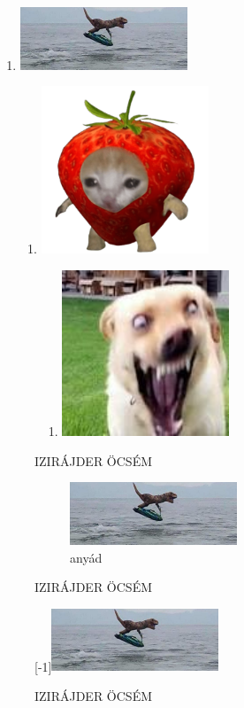 \documentclass{article}
\begin{document}
\begin{enumerate}
\item \includegraphics[width=5cm]{forras/image1}
\begin{enumerate}
\item \includegraphics[width=5cm]{forras/image2}
\begin{enumerate}
\item \includegraphics[width=5cm]{forras/image3}
\end{enumerate}
\end{enumerate}
\end{enumerate}
\begin{figure}[bt]
\centering
\caption{IZIRÁJDER ÖCSÉM}
\begin{subfigure}[c]{5cm}
\includegraphics[width=5cm]{forras/image1}
\caption{anyád}
\end{subfigure}
\caption{IZIRÁJDER ÖCSÉM}
\caption{IZIRÁJDER ÖCSÉM}
\scalebox{-1}[-1]{\includegraphics[width=5cm]{forras/image1}}
\end{figure}
\end{document}
